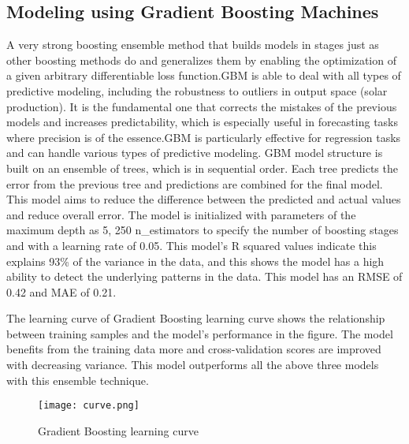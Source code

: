 \documentclass[conference]{IEEEtran}
\begin{document}
\subsection{Modeling using Gradient Boosting Machines}
A very strong boosting ensemble method that builds models in stages just as other boosting methods do and generalizes them by enabling the optimization of a given arbitrary differentiable loss function.GBM is able to deal with all types of predictive modeling, including the robustness to outliers in output space (solar production). It is the fundamental one that corrects the mistakes of the previous models and increases predictability, which is especially useful in forecasting tasks where precision is of the essence.GBM is particularly effective for regression tasks and can handle various types of predictive modeling. GBM model structure is built on an ensemble of trees, which is in sequential order. Each tree predicts the error from the previous tree and predictions are combined for the final model. This model aims to reduce the difference between the predicted and actual values and reduce overall error. The model is initialized with parameters of the maximum depth as 5, 250 n\_estimators to specify the number of boosting stages and with a learning rate of 0.05. This model’s R squared values indicate this explains 93\% of the variance in the data, and this shows the model has a high ability to detect the underlying patterns in the data. This model has an RMSE of 0.42 and MAE of 0.21. 

The learning curve of Gradient Boosting learning curve shows the relationship between training samples and the model’s performance in the figure. The model benefits from the training data more and cross-validation scores are improved with decreasing variance. This model outperforms all the above three models with this ensemble technique.

\begin{figure}[H] %
    \centering
    \texttt{[image: curve.png]}
    \caption{Gradient Boosting learning curve}
    \label{fig: Actual vs Predicted values by SVM}
\end{figure}
\end{document}
